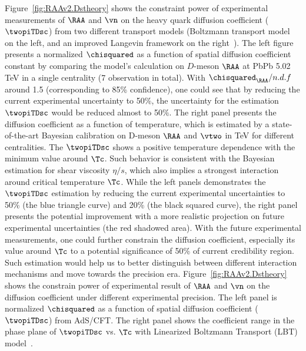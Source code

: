 Figure~\ref{fig:RAAv2.Dstheory} shows the constraint power of experimental measurements of  $\RAA$ and $\vn$ on the heavy quark diffusion coefficient ($\twopiTDsc$) from two different transport models (Boltzmann transport model~\cite{??} on the left, and an improved Langevin framework on the right~\cite{PhysRevC.97.014907}). The left figure presents a normalized $\chisquared$ as a function of spatial diffusion coefficient constant by comparing the model's calculation on $D$-meson $\RAA$ at PbPb 5.02 TeV in a single centrality (7 observation in total). With $\chisquared_{\RAA}/n.d.f$ around 1.5 (corresponding to 85\% confidence), one could see that by reducing the current experimental uncertainty to 50\%, the uncertainty for the estimation $\twopiTDsc$ would be reduced almost to 50$\%$. The right panel presents the diffusion coefficient as a function of temperature, which is estimated by a state-of-the-art Bayesian calibration on D-meson $\RAA$ and $\vtwo$ in  TeV for different centralities. The $\twopiTDsc$ shows a positive temperature dependence with the minimum value around $\Tc$. Such behavior is consistent with the Bayesian estimation for shear viscosity $\eta/s$, which also implies a strongest interaction around critical temperature $\Tc$. While the left panels demonstrates the $\twopiTDsc$ estimation by reducing the current experimental uncertainties to 50\% (the blue triangle curve) and 20\% (the black squared curve), the right panel presents the potential improvement with a more realistic projection on future experimental uncertainties (the red shadowed area). With the future experimental measurements, one could further constrain the diffusion coefficient, especially its value around $\Tc$ to a potential significance of 50\% of current credibility region. Such estimation would help us to better distinguish between different interaction mechanisms and move towards the precision era. Figure~\ref{fig:RAAv2.Dstheory} shows the constrain power of experimental result of $\RAA$ and $\vn$ on the diffusion coefficient under different experimental precision. The left panel is normalized $\chisquared$ as a function of spatial diffusion coefficient ($\twopiTDsc$) from AdS/CFT. The right panel shows the coefficient range in the phase plane of $\twopiTDsc$ vs. $\Tc$ with Linearized Boltzmann Transport (LBT) model~\cite{PhysRevC.94.014909}.



